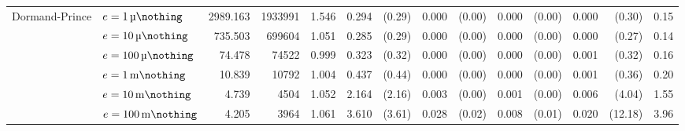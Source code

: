 \begin{sidewaystable}[p]
\begin{tabular}{p{1.5cm} l r r r rr rr rr rr r}
	\multirow{6}{*}{\parbox{1.5cm}{\raggedleft Dormand-Prince}}
		& $e=\SI{1}{\micro\nothing}$	&   2989.163	&  1933991	&      1.546	&      0.294	& (0.29)	&      0.000	& (0.00)	&      0.000	& (0.00)	&      0.000	& (0.30)	& 0.15\\
		& $e=\SI{10}{\micro\nothing}$	&    735.503	&   699604	&      1.051	&      0.285	& (0.29)	&      0.000	& (0.00)	&      0.000	& (0.00)	&      0.000	& (0.27)	& 0.14\\
		& $e=\SI{100}{\micro\nothing}$	&     74.478	&    74522	&      0.999	&      0.323	& (0.32)	&      0.000	& (0.00)	&      0.000	& (0.00)	&      0.001	& (0.32)	& 0.16\\
		& $e=\SI{1}{\milli\nothing}$	&     10.839	&    10792	&      1.004	&      0.437	& (0.44)	&      0.000	& (0.00)	&      0.000	& (0.00)	&      0.001	& (0.36)	& 0.20\\
		& $e=\SI{10}{\milli\nothing}$	&      4.739	&     4504	&      1.052	&      2.164	& (2.16)	&      0.003	& (0.00)	&      0.001	& (0.00)	&      0.006	& (4.04)	& 1.55\\
		& $e=\SI{100}{\milli\nothing}$	&      4.205	&     3964	&      1.061	&      3.610	& (3.61)	&      0.028	& (0.02)	&      0.008	& (0.01)	&      0.020	& (12.18)	& 3.96\\
	\bottomrule
\end{tabular}
\label{tbl:integrator_adexp_fastexp}
\end{sidewaystable}